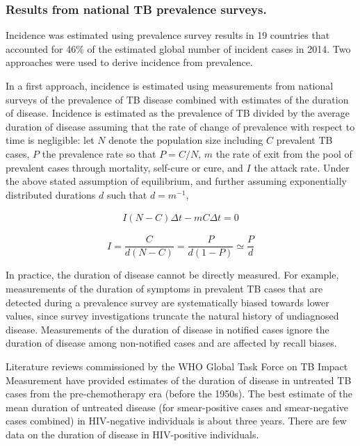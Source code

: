 \subsubsection {Results from national TB prevalence surveys.} Incidence was estimated using prevalence survey results in 19 countries that accounted for 46\% of the estimated global number of incident cases in 2014. Two approaches were used to derive incidence from prevalence.

In a first approach, incidence is estimated using measurements from national surveys of the prevalence of TB disease combined with estimates of the duration of disease. Incidence is estimated as the prevalence of TB divided by the average duration of disease assuming that the rate of change of prevalence with respect to time is negligible: let $N$ denote the population size including $C$ prevalent TB cases, $P$ the prevalence rate so that $P = C/N$, $m$ the rate of exit from the pool of prevalent cases through mortality, self-cure or cure, and $I$ the attack rate. Under the above stated assumption of equilibrium, and further assuming exponentially distributed durations $d$ such that $d = m^{-1}$,

\begin{align*}
I(N - C)\Delta t - m C\Delta t = 0
\end{align*}

\begin{equation}
I = \frac{C}{d(N - C)} = \frac{P}{d(1 - P)} \simeq \frac{P}{d}
\label{eqn:prev2inc}
\end{equation}

In practice, the duration of disease cannot be directly measured. For example, measurements of the duration of symptoms in prevalent TB cases that are detected during a prevalence survey are systematically biased towards lower values, since survey investigations truncate the natural history of undiagnosed disease. Measurements of the duration of disease in notified cases ignore the duration of disease among non-notified cases and are affected by recall biases. 

Literature reviews commissioned by the WHO Global Task Force on TB Impact Measurement have provided estimates of the duration of disease in untreated TB cases from the pre-chemotherapy era (before the 1950s). The best estimate of the mean duration of untreated disease (for smear-positive cases and smear-negative cases combined) in HIV-negative individuals is about three years. There are few data on the duration of disease in HIV-positive individuals. 

